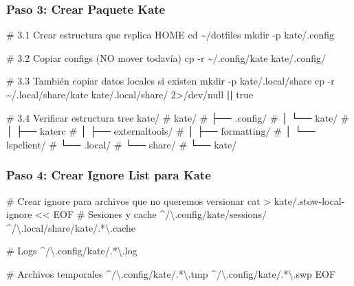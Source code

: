 \documentclass[
  doc,
  floatsintext,
  longtable,
  a4paper,
  nolmodern,
  notxfonts,
  notimes,
  12pt,
  colorlinks=true,linkcolor=blue,citecolor=blue,urlcolor=blue]{apa7}
\newenvironment{Shaded}{\begin{snugshade}}{\end{snugshade}}
\newcommand{\AttributeTok}[1]{\textcolor[rgb]{0.40,0.45,0.13}{#1}}
\newcommand{\BuiltInTok}[1]{\textcolor[rgb]{0.00,0.23,0.31}{#1}}
\newcommand{\CommentTok}[1]{\textcolor[rgb]{0.37,0.37,0.37}{#1}}
\newcommand{\DecValTok}[1]{\textcolor[rgb]{0.68,0.00,0.00}{#1}}
\newcommand{\ExtensionTok}[1]{\textcolor[rgb]{0.00,0.23,0.31}{#1}}
\newcommand{\FunctionTok}[1]{\textcolor[rgb]{0.28,0.35,0.67}{#1}}
\newcommand{\KeywordTok}[1]{\textcolor[rgb]{0.00,0.23,0.31}{\textbf{#1}}}
\newcommand{\NormalTok}[1]{\textcolor[rgb]{0.00,0.23,0.31}{#1}}
\newcommand{\OperatorTok}[1]{\textcolor[rgb]{0.37,0.37,0.37}{#1}}
\newcommand{\StringTok}[1]{\textcolor[rgb]{0.13,0.47,0.30}{#1}}
\begin{document}
\subsubsection{Paso 3: Crear Paquete
Kate}\label{paso-3-crear-paquete-kate}

\begin{Shaded}
\begin{Highlighting}[]
\CommentTok{\# 3.1 Crear estructura que replica HOME}
\BuiltInTok{cd}\NormalTok{ \textasciitilde{}/dotfiles}
\FunctionTok{mkdir} \AttributeTok{{-}p}\NormalTok{ kate/.config}

\CommentTok{\# 3.2 Copiar configs (NO mover todavía)}
\FunctionTok{cp} \AttributeTok{{-}r}\NormalTok{ \textasciitilde{}/.config/kate kate/.config/}

\CommentTok{\# 3.3 También copiar datos locales si existen}
\FunctionTok{mkdir} \AttributeTok{{-}p}\NormalTok{ kate/.local/share}
\FunctionTok{cp} \AttributeTok{{-}r}\NormalTok{ \textasciitilde{}/.local/share/kate kate/.local/share/ }\DecValTok{2}\OperatorTok{\textgreater{}}\NormalTok{/dev/null }\KeywordTok{||} \FunctionTok{true}

\CommentTok{\# 3.4 Verificar estructura}
\ExtensionTok{tree}\NormalTok{ kate/}
\CommentTok{\# kate/}
\CommentTok{\# ├── .config/}
\CommentTok{\# │   └── kate/}
\CommentTok{\# │       ├── katerc}
\CommentTok{\# │       ├── externaltools/}
\CommentTok{\# │       ├── formatting/}
\CommentTok{\# │       └── lspclient/}
\CommentTok{\# └── .local/}
\CommentTok{\#     └── share/}
\CommentTok{\#         └── kate/}
\end{Highlighting}
\end{Shaded}

\subsubsection{Paso 4: Crear Ignore List para
Kate}\label{paso-4-crear-ignore-list-para-kate}

\begin{Shaded}
\begin{Highlighting}[]
\CommentTok{\# Crear ignore para archivos que no queremos versionar}
\FunctionTok{cat} \OperatorTok{\textgreater{}}\NormalTok{ kate/.stow{-}local{-}ignore }\OperatorTok{\textless{}\textless{} \textquotesingle{}EOF\textquotesingle{}}
\StringTok{\# Sesiones y cache}
\StringTok{\^{}/\textbackslash{}.config/kate/sessions/}
\StringTok{\^{}/\textbackslash{}.local/share/kate/.*\textbackslash{}.cache}

\StringTok{\# Logs}
\StringTok{\^{}/\textbackslash{}.config/kate/.*\textbackslash{}.log}

\StringTok{\# Archivos temporales}
\StringTok{\^{}/\textbackslash{}.config/kate/.*\textbackslash{}.tmp}
\StringTok{\^{}/\textbackslash{}.config/kate/.*\textbackslash{}.swp}
\OperatorTok{EOF}
\end{Highlighting}
\end{Shaded}
\end{document}
